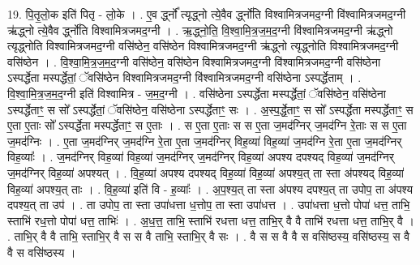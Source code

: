 \documentclass[17pt]{extarticle}
\begin{document}
19. पि॒तृ॒लो॒क इति॑ पितृ - लो॒के । . ए॒व र्द्ध्नो᳚ त्यृद्ध्नो त्ये॒वैव र्द्ध्नो॑ति विश्वामित्रजमद॒ग्नी वि॑श्वामित्रजमद॒ग्नी ऋ॑द्ध्नो त्ये॒वैव र्द्ध्नो॑ति विश्वामित्रजमद॒ग्नी । . ऋ॒द्ध्नो॒ति॒ वि॒श्वा॒मि॒त्र॒ज॒म॒द॒ग्नी वि॑श्वामित्रजमद॒ग्नी ऋ॑द्ध्नो त्यृद्ध्नोति विश्वामित्रजमद॒ग्नी वसि॑ष्ठेन॒ वसि॑ष्ठेन विश्वामित्रजमद॒ग्नी ऋ॑द्ध्नो त्यृद्ध्नोति विश्वामित्रजमद॒ग्नी वसि॑ष्ठेन । . वि॒श्वा॒मि॒त्र॒ज॒म॒द॒ग्नी वसि॑ष्ठेन॒ वसि॑ष्ठेन विश्वामित्रजमद॒ग्नी वि॑श्वामित्रजमद॒ग्नी वसि॑ष्ठेना ऽस्पर्द्धेता मस्पर्द्धेतां॒ ॅवसि॑ष्ठेन विश्वामित्रजमद॒ग्नी वि॑श्वामित्रजमद॒ग्नी वसि॑ष्ठेना ऽस्पर्द्धेताम् । . वि॒श्वा॒मि॒त्र॒ज॒म॒द॒ग्नी इति॑ विश्वामित्र - ज॒म॒द॒ग्नी । . वसि॑ष्ठेना ऽस्पर्द्धेता मस्पर्द्धेतां॒ ॅवसि॑ष्ठेन॒ वसि॑ष्ठेना ऽस्पर्द्धेताꣳ॒॒ स सो᳚ ऽस्पर्द्धेतां॒ ॅवसि॑ष्ठेन॒ वसि॑ष्ठेना ऽस्पर्द्धेताꣳ॒॒ सः । . अ॒स्प॒र्द्धे॒ताꣳ॒॒ स सो᳚ ऽस्पर्द्धेता मस्पर्द्धेताꣳ॒॒ स ए॒ता ए॒ताः सो᳚ ऽस्पर्द्धेता मस्पर्द्धेताꣳ॒॒ स ए॒ताः । . स ए॒ता ए॒ताः स स ए॒ता ज॒मद॑ग्निर् ज॒मद॑ग्नि रे॒ताः स स ए॒ता ज॒मद॑ग्निः । . ए॒ता ज॒मद॑ग्निर् ज॒मद॑ग्नि रे॒ता ए॒ता ज॒मद॑ग्निर् विह॒व्या॑ विह॒व्या॑ ज॒मद॑ग्नि रे॒ता ए॒ता ज॒मद॑ग्निर् विह॒व्याः᳚ । . ज॒मद॑ग्निर् विह॒व्या॑ विह॒व्या॑ ज॒मद॑ग्निर् ज॒मद॑ग्निर् विह॒व्या॑ अपश्य दपश्यद् विह॒व्या॑ ज॒मद॑ग्निर् ज॒मद॑ग्निर् विह॒व्या॑ अपश्यत् । . वि॒ह॒व्या॑ अपश्य दपश्यद् विह॒व्या॑ विह॒व्या॑ अपश्य॒त् ता स्ता अ॑पश्यद् विह॒व्या॑ विह॒व्या॑ अपश्य॒त् ताः । . वि॒ह॒व्या॑ इति॑ वि - ह॒व्याः᳚ । . अ॒प॒श्य॒त् ता स्ता अ॑पश्य दपश्य॒त् ता उपोप॒ ता अ॑पश्य दपश्य॒त् ता उप॑ । . ता उपोप॒ ता स्ता उपा॑धत्ता ध॒त्तोप॒ ता स्ता उपा॑धत्त । . उपा॑धत्ता ध॒त्तो पोपा॑ धत्त॒ ताभि॒ स्ताभि॑ रध॒त्तो पोपा॑ धत्त॒ ताभिः॑ । . अ॒ध॒त्त॒ ताभि॒ स्ताभि॑ रधत्ता धत्त॒ ताभि॒र् वै वै ताभि॑ रधत्ता धत्त॒ ताभि॒र् वै । . ताभि॒र् वै वै ताभि॒ स्ताभि॒र् वै स स वै ताभि॒ स्ताभि॒र् वै सः । . वै स स वै वै स वसि॑ष्ठस्य॒ वसि॑ष्ठस्य॒ स वै वै स वसि॑ष्ठस्य । \newline
\end{document}
